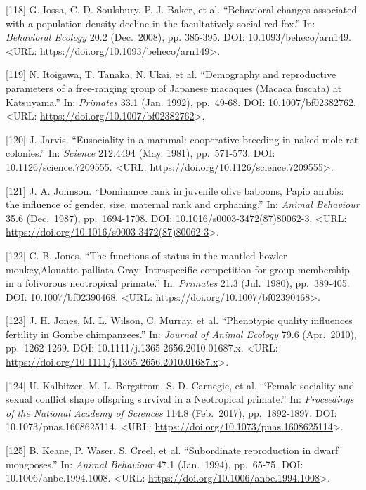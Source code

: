 \documentclass[
]{article}
\begin{document}
{[}118{]} G. Iossa, C. D. Soulsbury, P. J. Baker, et al. ``Behavioral
changes associated with a population density decline in the
facultatively social red fox.'' In: \emph{Behavioral Ecology} 20.2
(Dec.~2008), pp. 385-395. DOI: 10.1093/beheco/arn149. \textless URL:
\url{https://doi.org/10.1093/beheco/arn149}\textgreater.

{[}119{]} N. Itoigawa, T. Tanaka, N. Ukai, et al. ``Demography and
reproductive parameters of a free-ranging group of Japanese macaques
(Macaca fuscata) at Katsuyama.'' In: \emph{Primates} 33.1 (Jan. 1992),
pp.~49-68. DOI: 10.1007/bf02382762. \textless URL:
\url{https://doi.org/10.1007/bf02382762}\textgreater.

{[}120{]} J. Jarvis. ``Eusociality in a mammal: cooperative breeding in
naked mole-rat colonies.'' In: \emph{Science} 212.4494 (May. 1981),
pp.~571-573. DOI: 10.1126/science.7209555. \textless URL:
\url{https://doi.org/10.1126/science.7209555}\textgreater.

{[}121{]} J. A. Johnson. ``Dominance rank in juvenile olive baboons,
Papio anubis: the influence of gender, size, maternal rank and
orphaning.'' In: \emph{Animal Behaviour} 35.6 (Dec.~1987),
pp.~1694-1708. DOI: 10.1016/s0003-3472(87)80062-3. \textless URL:
\url{https://doi.org/10.1016/s0003-3472(87)80062-3}\textgreater.

{[}122{]} C. B. Jones. ``The functions of status in the mantled howler
monkey,Alouatta palliata Gray: Intraspecific competition for group
membership in a folivorous neotropical primate.'' In: \emph{Primates}
21.3 (Jul.~1980), pp.~389-405. DOI: 10.1007/bf02390468. \textless URL:
\url{https://doi.org/10.1007/bf02390468}\textgreater.

{[}123{]} J. H. Jones, M. L. Wilson, C. Murray, et al. ``Phenotypic
quality influences fertility in Gombe chimpanzees.'' In: \emph{Journal
of Animal Ecology} 79.6 (Apr.~2010), pp.~1262-1269. DOI:
10.1111/j.1365-2656.2010.01687.x. \textless URL:
\url{https://doi.org/10.1111/j.1365-2656.2010.01687.x}\textgreater.

{[}124{]} U. Kalbitzer, M. L. Bergstrom, S. D. Carnegie, et al.~``Female
sociality and sexual conflict shape offspring survival in a Neotropical
primate.'' In: \emph{Proceedings of the National Academy of Sciences}
114.8 (Feb.~2017), pp.~1892-1897. DOI: 10.1073/pnas.1608625114.
\textless URL:
\url{https://doi.org/10.1073/pnas.1608625114}\textgreater.

{[}125{]} B. Keane, P. Waser, S. Creel, et al. ``Subordinate
reproduction in dwarf mongooses.'' In: \emph{Animal Behaviour} 47.1
(Jan.~1994), pp.~65-75. DOI: 10.1006/anbe.1994.1008. \textless URL:
\url{https://doi.org/10.1006/anbe.1994.1008}\textgreater.
\end{document}

